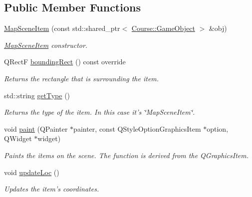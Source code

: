\subsection*{Public Member Functions}
\begin{DoxyCompactItemize}
\item 
\hyperlink{class_student_1_1_map_scene_item_a2bcaeecbe183a3dd4a5d432e680027d4}{Map\-Scene\-Item} (const std\-::shared\-\_\-ptr$<$ \hyperlink{class_course_1_1_game_object}{Course\-::\-Game\-Object} $>$ \&obj)
\begin{DoxyCompactList}\small\item\em \hyperlink{class_student_1_1_map_scene_item}{Map\-Scene\-Item} constructor. \end{DoxyCompactList}\item 
Q\-Rect\-F \hyperlink{class_student_1_1_map_scene_item_a787b3d644deb4ea6f9708d2233d2fc99}{bounding\-Rect} () const override
\begin{DoxyCompactList}\small\item\em Returns the rectangle that is surrounding the item. \end{DoxyCompactList}\item 
std\-::string \hyperlink{class_student_1_1_map_scene_item_a6f4badea271ec039183299eaa537c77d}{get\-Type} ()
\begin{DoxyCompactList}\small\item\em Returns the type of the item. In this case it's \char`\"{}\-Map\-Scene\-Item\char`\"{}. \end{DoxyCompactList}\item 
void \hyperlink{class_student_1_1_map_scene_item_adb0a3bca97ed8df20bbc2cdbc41dd4dc}{paint} (Q\-Painter $\ast$painter, const Q\-Style\-Option\-Graphics\-Item $\ast$option, Q\-Widget $\ast$widget)
\begin{DoxyCompactList}\small\item\em Paints the items on the scene. The function is derived from the Q\-Graphics\-Item. \end{DoxyCompactList}\item 
\hypertarget{class_student_1_1_map_scene_item_a155c8b60d3c262a238ab0665f81284e4}{void \hyperlink{class_student_1_1_map_scene_item_a155c8b60d3c262a238ab0665f81284e4}{update\-Loc} ()}\label{class_student_1_1_map_scene_item_a155c8b60d3c262a238ab0665f81284e4}

\begin{DoxyCompactList}\small\item\em Updates the item's coordinates. \end{DoxyCompactList}\end{DoxyCompactItemize}
